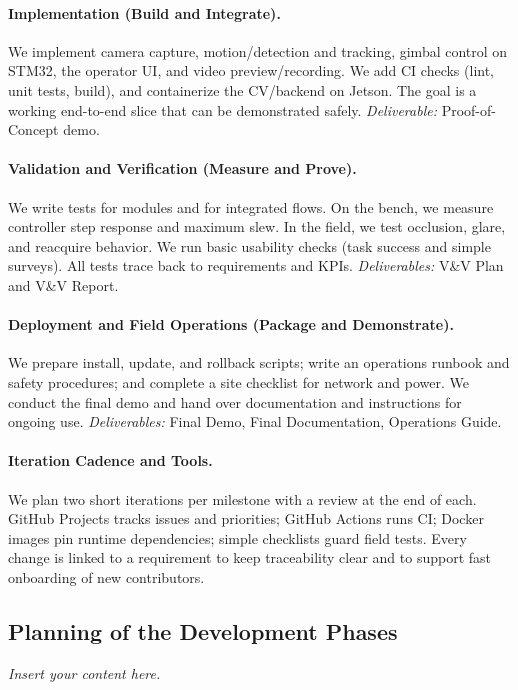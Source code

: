\documentclass[12pt]{article}
\newcommand{\lips}{\textit{Insert your content here.}}
\begin{document}
\paragraph{Implementation (Build and Integrate).}
We implement camera capture, motion/detection and tracking, gimbal control on
STM32, the operator UI, and video preview/recording. We add CI checks (lint,
unit tests, build), and containerize the CV/backend on Jetson. The goal is a
working end-to-end slice that can be demonstrated safely. \emph{Deliverable:}
Proof-of-Concept demo.

\paragraph{Validation and Verification (Measure and Prove).}
We write tests for modules and for integrated flows. On the bench, we measure
controller step response and maximum slew. In the field, we test occlusion,
glare, and reacquire behavior. We run basic usability checks (task success and
simple surveys). All tests trace back to requirements and KPIs.
\emph{Deliverables:} V\&V Plan and V\&V Report.

\paragraph{Deployment and Field Operations (Package and Demonstrate).}
We prepare install, update, and rollback scripts; write an operations runbook
and safety procedures; and complete a site checklist for network and power. We
conduct the final demo and hand over documentation and instructions for ongoing
use. \emph{Deliverables:} Final Demo, Final Documentation, Operations Guide.

\paragraph{Iteration Cadence and Tools.}
We plan two short iterations per milestone with a review at the end of each.
GitHub Projects tracks issues and priorities; GitHub Actions runs CI; Docker
images pin runtime dependencies; simple checklists guard field tests. Every
change is linked to a requirement to keep traceability clear and to support
fast onboarding of new contributors.

\subsection{Planning of the Development Phases}
\lips
\end{document}
